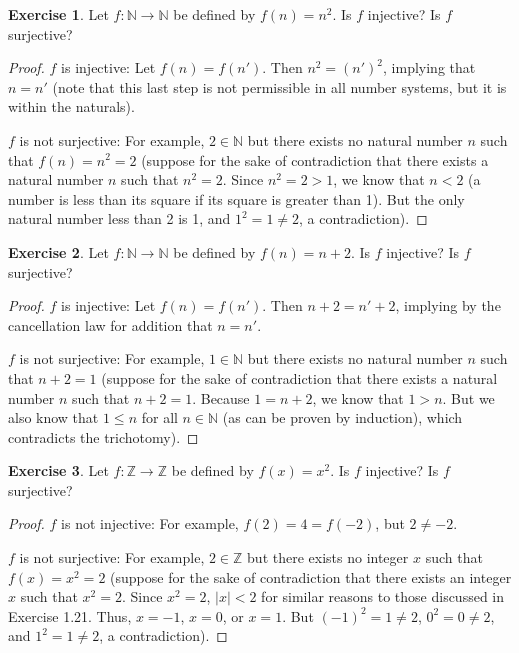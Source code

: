 \documentclass[titlepage]{article}
\newcounter{script}
\theoremstyle{definition}
\newtheorem{exercise}{Exercise}[script]
\newcommand{\N}{\mathbb{N}}
\newcommand{\Z}{\mathbb{Z}}
\begin{document}
\begin{exercise}
    Let $f:\N\to\N$ be defined by $f(n)=n^2$. Is $f$ injective? Is $f$ surjective?
    \begin{proof}
        $f$ is injective: Let $f(n)=f(n')$. Then $n^2=(n')^2$, implying that $n=n'$ (note that this last step is not permissible in all number systems, but it is within the naturals).\par
        $f$ is not surjective: For example, $2\in\N$ but there exists no natural number $n$ such that $f(n)=n^2=2$ (suppose for the sake of contradiction that there exists a natural number $n$ such that $n^2=2$. Since $n^2=2>1$, we know that $n<2$ (a number is less than its square if its square is greater than 1). But the only natural number less than 2 is 1, and $1^2=1\neq 2$, a contradiction).
    \end{proof}
\end{exercise}

\begin{exercise}
    Let $f:\N\to\N$ be defined by $f(n)=n+2$. Is $f$ injective? Is $f$ surjective?
    \begin{proof}
        $f$ is injective: Let $f(n)=f(n')$. Then $n+2=n'+2$, implying by the cancellation law for addition that $n=n'$.\par
        $f$ is not surjective: For example, $1\in\N$ but there exists no natural number $n$ such that $n+2=1$ (suppose for the sake of contradiction that there exists a natural number $n$ such that $n+2=1$. Because $1=n+2$, we know that $1>n$. But we also know that $1\leq n$ for all $n\in\N$ (as can be proven by induction), which contradicts the trichotomy).
    \end{proof}
\end{exercise}

\begin{exercise}
    Let $f:\Z\to\Z$ be defined by $f(x)=x^2$. Is $f$ injective? Is $f$ surjective?
    \begin{proof}
        $f$ is not injective: For example, $f(2)=4=f(-2)$, but $2\neq -2$.\par
        $f$ is not surjective: For example, $2\in\Z$ but there exists no integer $x$ such that $f(x)=x^2=2$ (suppose for the sake of contradiction that there exists an integer $x$ such that $x^2=2$. Since $x^2=2$, $|x|<2$ for similar reasons to those discussed in Exercise 1.21. Thus, $x=-1$, $x=0$, or $x=1$. But $(-1)^2=1\neq 2$, $0^2=0\neq 2$, and $1^2=1\neq 2$, a contradiction).
    \end{proof}
\end{exercise}
\end{document}
